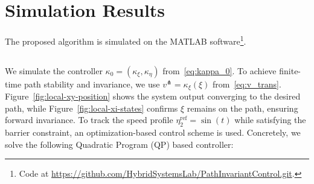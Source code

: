 \section{Simulation Results}\label{section:simulation}
The proposed algorithm is simulated on the MATLAB software\footnote{Code at \hyperlink{https://github.com/HybridSystemsLab/HybridGloballyPathInvariantControl.git}{https://github.com/HybridSystemsLab/PathInvariantControl.git}.}. 
\subsection{}
We simulate the controller $\kappa_0 = (\kappa_\xi,\kappa_\eta)$ from~\eqref{eq:kappa_0}. To achieve finite-time path stability and invariance, we use $v^\pitchfork = \kappa_\xi(\xi)$ from~\eqref{eq:v_trans}. Figure~\ref{fig:local-xy-position} shows the system output converging to the desired path, while Figure~\ref{fig:local-xi-states} confirms $\xi$ remains on the path, ensuring forward invariance. To track the speed profile $\eta^{\mathrm{ref}}_2 = \sin(t)$ while satisfying the barrier constraint, an optimization-based control scheme is used.
Concretely, we solve the following Quadratic Program (QP) based controller:
